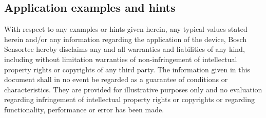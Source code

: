 \subsection{Application examples and hints}

With respect to any examples or hints given herein, any typical values stated herein and/or any information regarding the application of the device, Bosch Sensortec hereby disclaims any and all warranties and liabilities of any kind, including without limitation warranties of non-infringement of intellectual property rights or copyrights of any third party. The information given in this document shall in no event be regarded as a guarantee of conditions or characteristics. They are provided for illustrative purposes only and no evaluation regarding infringement of intellectual property rights or copyrights or regarding functionality, performance or error has been made.
